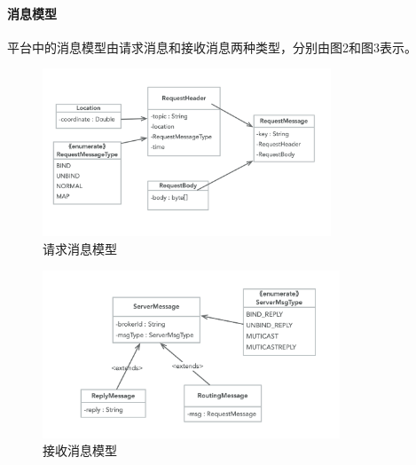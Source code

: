 \documentclass[a4paper]{article}
\theoremstyle{definition}
\begin{document}
\paragraph{消息模型}
平台中的消息模型由请求消息和接收消息两种类型，分别由图2和图3表示。
\begin{figure}[ht]
 \centering
 \includegraphics[height=5cm]{images/request_msg.png}
 \caption{请求消息模型}
 \label{fig:singleblock}
\end{figure}
\begin{figure}[ht]
 \centering
 \includegraphics[height=5cm]{images/server_msg.png}
 \caption{接收消息模型}
 \label{fig:singleblock}
\end{figure}
\end{document}
